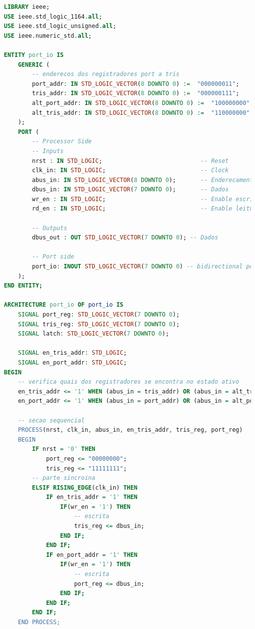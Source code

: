 \documentclass{article}
\begin{document}
\begin{lstlisting}[language=VHDL, caption={Código VHDL w\_reg}]
LIBRARY ieee;
USE ieee.std_logic_1164.all;
USE ieee.std_logic_unsigned.all;
USE ieee.numeric_std.all;

ENTITY port_io IS
    GENERIC (
        -- enderecos dos registradores port a tris
        port_addr: IN STD_LOGIC_VECTOR(8 DOWNTO 0) :=  "000000011";
        tris_addr: IN STD_LOGIC_VECTOR(8 DOWNTO 0) :=  "000000111";
        alt_port_addr: IN STD_LOGIC_VECTOR(8 DOWNTO 0) :=  "100000000";
        alt_tris_addr: IN STD_LOGIC_VECTOR(8 DOWNTO 0) :=  "110000000"
    );
    PORT (
        -- Processor Side
        -- Inputs
        nrst : IN STD_LOGIC;                            -- Reset
        clk_in: IN STD_LOGIC;                           -- Clock
        abus_in: IN STD_LOGIC_VECTOR(8 DOWNTO 0);       -- Enderecamento
        dbus_in: IN STD_LOGIC_VECTOR(7 DOWNTO 0);       -- Dados
        wr_en : IN STD_LOGIC;                           -- Enable escrita
        rd_en : IN STD_LOGIC;                           -- Enable leitura

        -- Outputs
        dbus_out : OUT STD_LOGIC_VECTOR(7 DOWNTO 0); -- Dados

        -- Port side
        port_io: INOUT STD_LOGIC_VECTOR(7 DOWNTO 0) -- bidirectional port
    );
END ENTITY;

ARCHITECTURE port_io OF port_io IS
    SIGNAL port_reg: STD_LOGIC_VECTOR(7 DOWNTO 0);
    SIGNAL tris_reg: STD_LOGIC_VECTOR(7 DOWNTO 0);
    SIGNAL latch: STD_LOGIC_VECTOR(7 DOWNTO 0);

    SIGNAL en_tris_addr: STD_LOGIC;
    SIGNAL en_port_addr: STD_LOGIC;
BEGIN
    -- verifica quais dos registradores se encontra no estado ativo
    en_tris_addr <= '1' WHEN (abus_in = tris_addr) OR (abus_in = alt_tris_addr) ELSE '0';
    en_port_addr <= '1' WHEN (abus_in = port_addr) OR (abus_in = alt_port_addr) ELSE '0';

    -- secao sequencial
    PROCESS(nrst, clk_in, abus_in, en_tris_addr, tris_reg, port_reg)
    BEGIN
        IF nrst = '0' THEN
            port_reg <= "00000000";
            tris_reg <= "11111111";
        -- parte sincroina
        ELSIF RISING_EDGE(clk_in) THEN
            IF en_tris_addr = '1' THEN
                IF(wr_en = '1') THEN
                    -- escrita
                    tris_reg <= dbus_in;
                END IF;
            END IF;
            IF en_port_addr = '1' THEN
                IF(wr_en = '1') THEN
                    -- escrita
                    port_reg <= dbus_in;
                END IF;
            END IF;
        END IF;
    END PROCESS;


\end{lstlisting}
\end{document}
